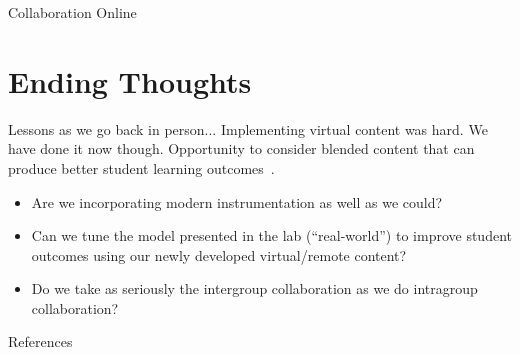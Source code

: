 \documentclass{beamer}
\begin{document}
\begin{frame}{Collaboration Online}
  \begin{center}
  \end{center}
\end{frame}

\section{Ending Thoughts}

\begin{frame}{Lessons as we go back in person...}
  Implementing virtual content was hard. We have done it now though.
  \pause
  Opportunity to consider blended content that can produce better student learning outcomes~\cite{Bumbacher2017, Olympiou2011}.
  \pause
  \begin{itemize}
    \item{
      Are we incorporating modern instrumentation as well as we could?
    }
    \pause
    \item{
      Can we tune the model presented in the lab (``real-world'') to improve student outcomes using our newly developed virtual/remote content?
    }
    \pause
    \item{
      Do we take as seriously the intergroup collaboration as we do intragroup collaboration?
    }
  \end{itemize}
\end{frame}

\renewcommand*{\bibfont}{\tiny}
\begin{frame}{References}{}
\printbibliography
\end{frame}
\end{document}
